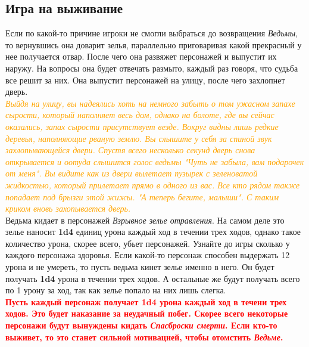 \documentclass[10pt,a4paper]{book}
\newcommand{\monster}[1]{\textit{#1}}
\newcommand{\dm}[1]{\\\textcolor{orange}{\textit{#1}}\\}
\newcommand{\thing}[1]{\textit{#1}}
\newcommand{\hardcore}[1]{\\\textcolor{red}{\textbf{#1}}\\}
\renewcommand{\d}[2][1]{\textbf {#1d{#2}}}
\begin{document}
			\subsection{Игра на выживание}
			Если по какой-то причине игроки не смогли выбраться до возвращения \monster{Ведьмы}, то вернувшись она доварит зелья, параллельно приговаривая какой прекрасный у нее получается отвар. После чего она развяжет персонажей и выпустит их наружу. На вопросы она будет отвечать размыто, каждый раз говоря, что судьба все решит за них. Она выпустит персонажей на улицу, после чего захлопнет дверь.
			\dm{Выйдя на улицу, вы надеялись хоть на немного забыть о том ужасном запахе сырости, который наполняет весь дом, однако на болоте, где вы сейчас оказались, запах сырости присутствует везде. Вокруг видны лишь редкие деревья, наполняющие рваную землю. Вы слышите у себя за спиной звук захлопывающейся двери. Спустя всего несколько секунд дверь снова открывается и оотуда слышится голос ведьмы "Чуть не забыла, вам подарочек от меня". Вы видите как из двери вылетает пузырек с зеленоватой жидкостью, который прилетает прямо в одного из вас. Все кто рядом также попадает под брызги этой жижы. "А теперь бегите, малыши". С таким криком вновь захопывается дверь.}
			Ведьма кидает в персонажей \thing{Взрывное зелье отравления}. На самом деле это зелье наносит \d{4} единиц урона каждый ход в течении трех ходов, однако такое количество урона, скорее всего, убьет персонажей. Узнайте до игры сколько у каждого персонажа здоровья. Если какой-то персонаж способен выдержать 12 урона и не умереть, то пусть ведьма кинет зелье именно в него. Он будет получать \d{4} урона в течении трех ходов. А остальные же будут получать всего по 1 урону за ход, так как зелье попало на них лишь слегка.
			\hardcore{Пусть каждый персонаж получает \d{4} урона каждый ход в течени  трех ходов. Это будет наказание за неудачный побег. Скорее всего некоторые персонажи будут вынуждены кидать \textit{Спасброски смерти}. Если кто-то выживет, то это станет сильной мотивацией, чтобы отомстить \monster{Ведьме}.}
		
\end{document}
